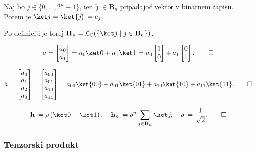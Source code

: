 \documentclass[mat1]{fmfdelo}
\newcommand{\C}{\mathbb C}
\renewcommand{\hat}{\widehat}
\newcommand{\p}[1]{\left( {#1} \right)}
\newcommand{\set}[2]{\left\{ #1 \mid #2 \right\}}
\newcommand{\hh}[1][]{\mathbf{h}_{#1}}
\newcommand{\B}[1][]{\mathbf{B}_{#1}}
\renewcommand{\H}[1][]{\mathbf{H}_{#1}}
\renewcommand{\L}[2][]{\mathcal{L}_{#1}{\p{#2}}}
\begin{document}
\begin{definicija}%
    Naj bo \( j \in \{0, \dots, 2^n-1\} \), ter \( \hat{\jmath} \in \B[n] \) pripadajoč vektor v binarnem zapisu. Potem je \( \ket j = \ket{\hat{\jmath}} \coloneqq e_j \).
\end{definicija}
\begin{opomba}
    Po definiciji je torej \( \H[n] = \L[\C]{\set{\ket j}{j\in\B[n]}} \).
\end{opomba}

\begin{primer}[\(n = 1\)]
    \[ 
        a = \begin{bmatrix}a_0 \\ a_1\end{bmatrix}
            = a_0\ket 0 + a_1\ket 1
            = a_0\begin{bmatrix}1 \\ 0\end{bmatrix} + a_1\begin{bmatrix}0 \\ 1\end{bmatrix}\text.\qedhere
    \]
\end{primer}

\begin{primer}[\(n = 2\)]
    \[
        a = \begin{bmatrix}a_0\\ a_1\\ a_2\\ a_3\end{bmatrix}
            = \begin{bmatrix}a_{00}\\ a_{01}\\ a_{10}\\ a_{11}\end{bmatrix}
            = a_{00}\ket{00} + a_{01}\ket{01} + a_{10}\ket{10} + a_{11}\ket{11}\text.\qedhere
    \]
\end{primer}

\begin{primer}%
    \[
        \hh \coloneqq \rho \left(\ket 0 + \ket 1\right),\quad
        \hh[n] \coloneqq \rho^n\sum_{j\in\B[n]} \ket j,\quad
        \rho \coloneqq \frac{1}{\sqrt2}\text.\qedhere
        \]
\end{primer}

\subsubsection{Tenzorski produkt}
\end{document}
